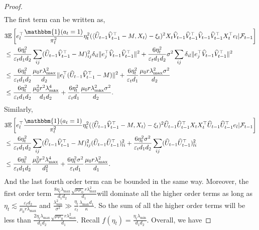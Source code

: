 \documentclass[12pt]{article}
\newcommand{\inp}[2]{\langle #1,#2\rangle}
\def\EE{{\mathbb E}}
\theoremstyle{plain}
\begin{document}
\begin{proof}
\begin{align*}
\end{align*}
The first term can be written as, 
\begin{align*}
    &3\EE\left[e_l^{\top} \frac{\mathbbm{1}(a_t=1)}{\pi_t^2}\eta_t^2(\inp{\widehat{U}_{t-1}\widehat{V}_{t-1}^{\top} - M}{X_t}-\xi_t)^2X_t\widehat{V}_{t-1}\widehat{V}_{t-1}^{\top}\widehat{V}_{t-1}\widehat{V}_{t-1}^{\top}X_t^{\top} e_l|\mathcal{F}_{t-1}\right] \\
    &\leq \frac{6\eta_t^2}{\varepsilon_t d_1d_2}\sum_{ij}(\widehat{U}_{t-1}\widehat{V}_{t-1}^{\top} - M)_{ij}^2\delta_{il}\|e_j^{\top}\widehat{V}_{t-1}\widehat{V}_{t-1}^{\top}\|^2 + \frac{6\eta_t^2}{\varepsilon_t d_1d_2}\sigma^2\sum_{ij} \delta_{il}\|e_j^{\top}\widehat{V}_{t-1}\widehat{V}_{t-1}^{\top}\|^2 \\
    &\leq \frac{6\eta_t^2}{\varepsilon_t d_1d_2}\frac{\mu_0r\lambda_{\max}^2}{d_2}\|e_l^{\top}(\widehat{U}_{t-1}\widehat{V}_{t-1}^{\top} - M)\|^2 + \frac{6\eta_t^2}{\varepsilon_t d_1}\frac{\mu_0r\lambda_{\max}^2\sigma^2}{d_2} \\
    &\leq \frac{6\eta_t^2}{\varepsilon_t d_1d_2}\frac{\mu_0^2r^2\lambda_{\max}^4}{d_1d_2} + \frac{6\eta_t^2}{\varepsilon_t d_1}\frac{\mu_0r\lambda_{\max}^2\sigma^2}{d_2}.
\end{align*}
Similarly, 
\begin{align*}
    &3\EE\left[e_l^{\top} \frac{\mathbbm{1}(a_t=1)}{\pi_t^2}\eta_t^2(\inp{\widehat{U}_{t-1}\widehat{V}_{t-1}^{\top}- M}{X_t}-\xi_t)^2\widehat{U}_{t-1}\widehat{U}_{t-1}^{\top}X_tX_t^{\top}\widehat{U}_{t-1}\widehat{U}_{t-1}^{\top} e_l|\mathcal{F}_{t-1}\right] \\
    &\leq \frac{6\eta_t^2}{\varepsilon_t d_1d_2}\sum_{ij} (\widehat{U}_{t-1}\widehat{V}_{t-1}^{\top} - M)_{ij}^2(\widehat{U}_{t-1}\widehat{U}_{t-1}^{\top})_{li}^2 + \frac{6\eta_t^2\sigma^2}{\varepsilon_t d_1d_2}\sum_{ij} (\widehat{U}_{t-1}\widehat{U}_{t-1}^{\top})_{li}^2 \\
    &\leq \frac{6\eta_t^2}{\varepsilon_t d_1d_2}\frac{\mu_0^2r^2\lambda_{\max}^4}{d_1^2} + \frac{6\eta_t^2\sigma^2}{\varepsilon_t d_1}\frac{\mu_0r\lambda_{\max}^2}{d_1}.
\end{align*}
And the last fourth order term can be bounded in the same way. Moreover, the first order term $\frac{8\eta_t\lambda_{\max}}{d_1d_2}\frac{\sqrt{\mu\mu_0}r\lambda_{\max}^2}{d_1}$will dominate all the higher order terms as long as $\eta_t\lesssim \frac{\varepsilon_t d_2}{\mu_0r\lambda_{\max}}$ and $\frac{\lambda_{\min}^2}{\sigma^2}\gg \frac{\eta_t}{\varepsilon_t}\frac{\lambda_{\max}d_1}{\kappa}$. So the sum of all the higher order terms will be less than $\frac{2\eta_t\lambda_{\max}}{d_1d_2}\frac{\sqrt{\mu\mu_0} r\lambda_{\max}^2}{d_1}$. Recall $f(\eta_t)=\frac{\eta_t\lambda_{\min}}{d_1d_2}$. Overall, we have

\end{proof}
\end{document}
